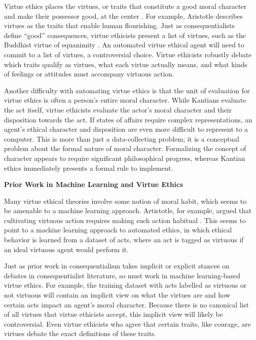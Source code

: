 \begin{isabellebody}
%
\endisatagdocument
{\isafolddocument}%
%
\isadelimdocument
%
\endisadelimdocument
%
\begin{isamarkuptext}%
Virtue ethics places the virtues, or traits that constitute a good moral character and make 
their possessor good, at the center \citep{vesep}. For example, Aristotle describes virtues as the 
traits that enable human flourishing. Just as consequentialists define ``good'' consequences, virtue 
ethicists present a list of virtues, such as the Buddhist virtue of equanimity \citep{mcrae}. An automated virtue 
ethical agent will need to commit to a list of virtues, a controversial choice. 
Virtue ethicists robustly debate which traits qualify as virtues, what each virtue actually means, and 
what kinds of feelings or attitudes must accompany virtuous action. 

Another difficulty with automating virtue ethics is that the unit of evaluation for virtue ethics
is often a person's entire moral character. While Kantians evaluate the act itself, virtue ethicists 
evaluate the actor's moral character and their 
disposition towards the act. If states of affairs
require complex representations, an agent's ethical character and disposition are even more difficult
to represent to a computer. This is more than just a data-collecting problem; it is a conceptual problem 
about the formal nature of moral character.
Formalizing the concept of character appears to require significant philosophical
progress, whereas Kantian ethics immediately presents a formal rule to implement.%
\end{isamarkuptext}\isamarkuptrue%
%
\begin{isamarkuptext}%
\noindent \textbf{Prior Work in Machine Learning and Virtue Ethics}%
\end{isamarkuptext}\isamarkuptrue%
%
\begin{isamarkuptext}%
Many virtue ethical theories involve some notion of 
moral habit, which seems to be amenable to a machine learning approach. Artistotle, for example, argued 
that cultivating virtuous action requires making such action habitual \citep{aristotle}. This seems to 
point to a machine learning approach to automated ethics, in which ethical behavior is learned from a 
dataset of acts, where an act is tagged as virtuous if an ideal virtuous agent would perform it. 

Just as prior work in consequentialism takes implicit or explicit stances on debates in consequentialist
literature, so must work in machine learning-based virtue ethics. For example, the training 
dataset with acts labelled as virtuous or not virtuous will contain an implicit view on what the virtues
are and how certain acts impact an agent's moral character. Because there is no canonical list of all virtues
that virtue ethicists accept, this implicit view will likely be controversial. Even virtue ethicists who agree
that certain traits, like courage, are virtues debate the exact definitions of these traits. 


\end{isamarkuptext}
\end{isabellebody}

